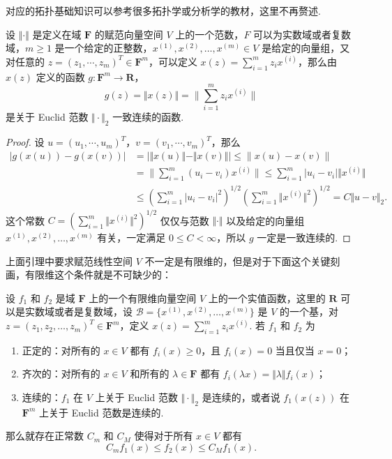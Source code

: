 对应的拓扑基础知识可以参考很多拓扑学或分析学的教材，这里不再赘述.

\begin{lemma}{}{}
    设 $\Vert \cdot\Vert$ 是定义在域 $\mathbf{F}$ 的赋范向量空间 $V$ 上的一个范数，$F$ 可以为实数域或者复数域，$m\geqslant 1$ 是一个给定的正整数，$x^{(1)}, x^{(2)}, \dots, x^{(m)}\in V$ 是给定的向量组，又对任意的 $z = (z_1, \cdots, z_m)^T \in \mathbf{F}^m$，可以定义 $x(z) = \sum\limits_{i=1}^{m}z_ix^{(i)}$，那么由 $x(z)$ 定义的函数 $g\colon \mathbf{F}^m\to \mathbf{R}$，
    \[g(z) = \Vert x(z)\Vert = \lVert \sum_{i=1}^{m}z_ix^{(i)}\rVert\] 是关于 Euclid 范数 $\Vert\cdot\Vert_2$ 一致连续的函数.
\end{lemma}

\begin{proof}
    设 $u = (u_1, \cdots, u_m)^T$，$v = (v_1, \cdots, v_m)^T$，那么
    \[\begin{aligned}
        \vert g(x(u)) - g(x(v))\vert
        &= \lvert \Vert x(u) \Vert - \Vert x(v) \Vert \rvert \leqslant \lVert x(u) - x(v)\rVert \\
        &= \lVert \sum_{i = 1}^{m} (u_i - v_i)x^{(i)}\rVert \leqslant \sum_{i = 1}^{m}\vert u_i - v_i\vert \Vert x^{(i)}\Vert \\
        &\leqslant \left(\sum_{i = 1}^{m}\vert u_i - v_i\vert^2\right)^{1/2}\left(\sum_{i = 1}^{m}\Vert x^{(i)}\Vert^2\right)^{1/2} =C\Vert u - v\Vert_2.
    \end{aligned}\]
    这个常数 $C = \left(\sum\limits_{i = 1}^{m}\Vert x^{(i)}\Vert^2\right)^{1/2}$ 仅仅与范数 $\Vert\cdot\Vert$ 以及给定的向量组 $x^{(1)}, x^{(2)}, \dots, x^{(m)}$ 有关，一定满足 $0 \leqslant C<\infty$，所以 $g$ 一定是一致连续的.
\end{proof}

上面引理中要求赋范线性空间 $V$ 不一定是有限维的，但是对于下面这个关键刻画，有限维这个条件就是不可缺少的：

\begin{theorem}{}{}
    设 $f_1$ 和 $f_2$ 是域 $\mathbf{F}$ 上的一个有限维向量空间 $V$ 上的一个实值函数，这里的 $\mathbf{R}$ 可以是实数域或者是复数域，设 $\mathcal{B} = \{x^{(1)}, x^{(2)}, \dots, x^{(m)}\}$ 是 $V$ 的一个基，对 $z = (z_1, z_2, \dots, z_m)^T\in \mathbf{F}^m$，定义 $x(z) = \sum\limits_{i=1}^{m}z_ix^{(i)}$. 若 $f_1$ 和 $f_2$ 为
    \begin{enumerate}
        \item 正定的：对所有的 $x\in V$ 都有 $f_i(x)\geqslant 0$，且 $f_i(x) = 0$ 当且仅当 $x = 0$；
        \item 齐次的：对所有的 $x\in V$ 和所有的 $\lambda\in\mathbf{F}$ 都有 $f_i(\lambda x) = \Vert \lambda\Vert f_i(x)$；
        \item 连续的：$f_1$ 在 $V$ 上关于 Euclid 范数 $\Vert\cdot\Vert_2$ 是连续的，或者说 $f_1(x(z))$ 在 $\mathbf{F}^m$ 上关于 Euclid 范数是连续的.
    \end{enumerate}
    那么就存在正常数 $C_m$ 和 $C_M$ 使得对于所有 $x\in V$ 都有 \[C_mf_1(x) \leqslant f_2(x) \leqslant C_Mf_1(x).\]
\end{theorem}

